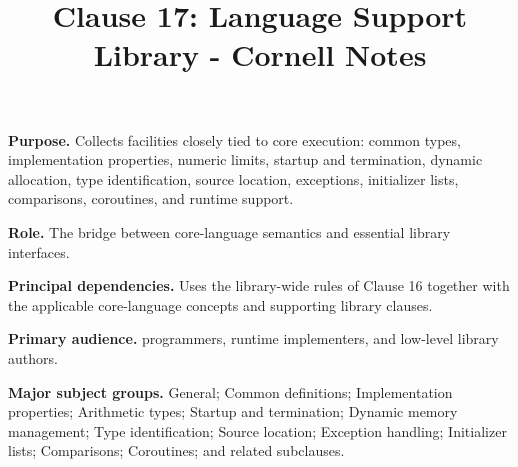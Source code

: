 \documentclass[11pt,letterpaper]{article}
\title{Clause 17: Language Support Library - Cornell Notes}
\author{}
\date{}
\begin{document}
\maketitle
\begin{CornellReferenceOrientationBox}
\textbf{Purpose.} Collects facilities closely tied to core execution: common types, implementation properties, numeric limits, startup and termination, dynamic allocation, type identification, source location, exceptions, initializer lists, comparisons, coroutines, and runtime support.
\par\textbf{Role.} The bridge between core-language semantics and essential library interfaces.
\par\textbf{Principal dependencies.} Uses the library-wide rules of Clause 16 together with the applicable core-language concepts and supporting library clauses.
\par\textbf{Primary audience.} programmers, runtime implementers, and low-level library authors.
\par\textbf{Major subject groups.} General; Common definitions; Implementation properties; Arithmetic types; Startup and termination; Dynamic memory management; Type identification; Source location; Exception handling; Initializer lists; Comparisons; Coroutines; and related subclauses.
\end{CornellReferenceOrientationBox}
\end{document}
